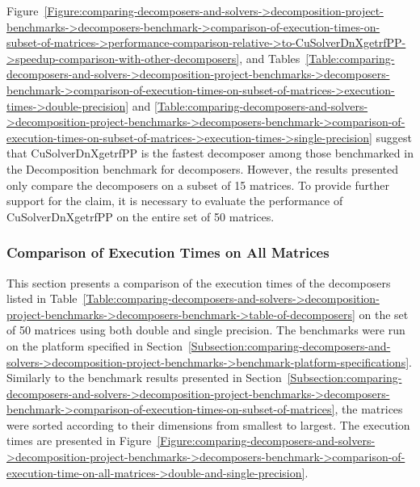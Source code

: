 Figure~\ref{Figure:comparing-decomposers-and-solvers->decomposition-project-benchmarks->decomposers-benchmark->comparison-of-execution-times-on-subset-of-matrices->performance-comparison-relative->to-CuSolverDnXgetrfPP->speedup-comparison-with-other-decomposers}, and Tables~\ref{Table:comparing-decomposers-and-solvers->decomposition-project-benchmarks->decomposers-benchmark->comparison-of-execution-times-on-subset-of-matrices->execution-times->double-precision} and \ref{Table:comparing-decomposers-and-solvers->decomposition-project-benchmarks->decomposers-benchmark->comparison-of-execution-times-on-subset-of-matrices->execution-times->single-precision} suggest that CuSolverDnXgetrfPP is the fastest decomposer among those benchmarked in the Decomposition benchmark for decomposers. However, the results presented only compare the decomposers on a subset of 15 matrices. To provide further support for the claim, it is necessary to evaluate the performance of CuSolverDnXgetrfPP on the entire set of 50 matrices.


\subsubsection{Comparison of Execution Times on All Matrices}
This section presents a comparison of the execution times of the decomposers listed in Table~\ref{Table:comparing-decomposers-and-solvers->decomposition-project-benchmarks->decomposers-benchmark->table-of-decomposers} on the set of 50 matrices using both double and single precision. The benchmarks were run on the platform specified in Section~\ref{Subsection:comparing-decomposers-and-solvers->decomposition-project-benchmarks->benchmark-platform-specifications}. Similarly to the benchmark results presented in Section~\ref{Subsection:comparing-decomposers-and-solvers->decomposition-project-benchmarks->decomposers-benchmark->comparison-of-execution-times-on-subset-of-matrices}, the matrices were sorted according to their dimensions from smallest to largest. The execution times are presented in Figure~\ref{Figure:comparing-decomposers-and-solvers->decomposition-project-benchmarks->decomposers-benchmark->comparison-of-execution-time-on-all-matrices->double-and-single-precision}.

